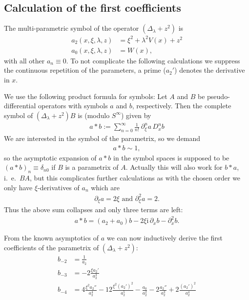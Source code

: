 \subsection{Calculation of the first coefficients}
The multi-parametric symbol of the operator $(\Delta_\lambda + z^2)$ is
\begin{align}
  a_2(x,\xi,\lambda,z) &= \xi^2 + \lambda^2 V(x) + z^2 \\
  a_0(x,\xi,\lambda,z) &= W(x),
  \label{eqn:symbol}
\end{align}
with all other $a_n \equiv 0$. To not complicate the following calculations we
suppress the continuous repetition of the parameters, a prime ($a_2'$) denotes
the derivative in $x$.

We use the following product formula for symbols: Let $A$ and $B$ be
pseudo-differential operators with symbols $a$ and $b$, respectively. Then the
complete symbol of $(\Delta_\lambda + z^2)B$ is (modulo $S^\infty$) given by
\begin{align}
  a * b := \sum_{n=0}^{\infty} \frac{1}{n!}\ \partial_\xi^n a\,D_x^n b
  \label{eqn:product-formula}
\end{align}
We are interested in the symbol of the parametrix, so we demand
\begin{align*}
  a * b \sim 1,
\end{align*}
so the asymptotic expansion of $a * b$ in the symbol spaces is supposed to be
$(a * b)_n \equiv \delta_{n0}$ if $B$ is a parametrix of $A$. Actually this will
also work for $b * a$, i.~e.\ $BA$, but this complicates further calculations as
with the chosen order we only have $\xi$-derivatives of $a_n$ which are
\begin{align}
  \partial_{\xi} a = 2\xi \text{ and } \partial_{\xi}^2 a = 2.
\end{align}
Thus the above sum collapses and only three terms are left:
\begin{align}
  a * b = (a_2 + a_0)b - 2\xi\mathrm i\,\partial_x b - \partial_x^2 b.
\end{align}

From the known asymptotics of $a$ we can now inductively derive the first
coefficients of the parametrix of $(\Delta_\lambda + z^2)$:
\begin{align*}
  b_{-2} &= \frac{1}{a_2} \\
  b_{-3} &= -2\frac{\xi a_2'}{a_2^3}\\
  b_{-4} &= 4\frac{\xi^2 a_2''}{a_2^4}
  - 12\frac{\xi^2 (a_2')^2}{a_2^5} - \frac{a_0}{a_2^2}
  - 2\frac{a_2''}{a_2^3} + 2\frac{(a_2')^2}{a_2^4} \\
  \label{eqn:coeff-symbol}
\end{align*}


